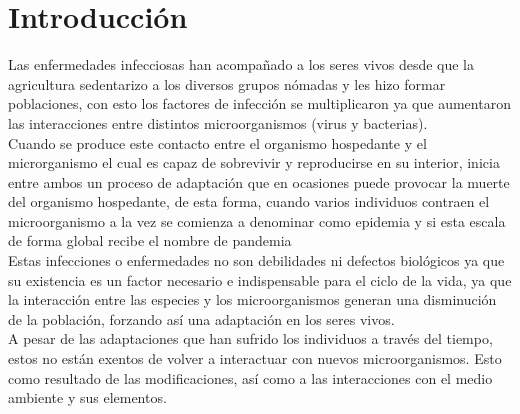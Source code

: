 
%

\chapter*{Introducción}

Las enfermedades infecciosas han acompañado a los seres vivos desde que la agricultura sedentarizo a los diversos grupos nómadas y les hizo formar poblaciones, con esto los factores de infección se multiplicaron ya que aumentaron las interacciones entre distintos microorganismos (virus y bacterias).\\

Cuando se produce este contacto entre el organismo hospedante y el microrganismo el cual es capaz de sobrevivir y reproducirse en su interior, inicia entre ambos un proceso de adaptación que en ocasiones puede provocar la muerte del organismo hospedante, de esta forma, cuando varios individuos contraen el microorganismo a la vez se comienza a denominar como epidemia y si esta escala de forma global recibe el nombre de pandemia\\

Estas infecciones o enfermedades no son debilidades ni defectos biológicos ya que su existencia es un factor necesario e indispensable para el ciclo de la vida, ya que la interacción entre las especies y los microorganismos generan una disminución de la población, forzando así una adaptación en los seres vivos.\\

A pesar de las adaptaciones que han sufrido los individuos a través del tiempo, estos no están exentos de volver a interactuar con nuevos microorganismos. Esto como resultado de las modificaciones, así como a las interacciones con el medio ambiente y sus elementos. \cite{HyFP}\\


